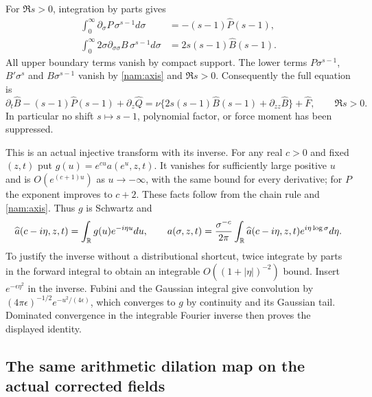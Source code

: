 For $\Re s>0$, integration by parts gives
\begin{align*}
 \int_0^\infty\partial_\sigma P\,\sigma^{s-1}d\sigma
    &=-(s-1)\widehat P(s-1),\\
 \int_0^\infty 2\sigma\partial_{\sigma\sigma}B\,
                       \sigma^{s-1}d\sigma
    &=2s(s-1)\widehat B(s-1).
\end{align*}
All upper boundary terms vanish by compact support. The lower terms
$P\sigma^{s-1}$, $B'\sigma^s$ and $B\sigma^{s-1}$ vanish by
\eqref{nam:axis} and $\Re s>0$. Consequently the full equation is
\begin{equation}
 \partial_t\widehat B-(s-1)\widehat P(s-1)+\partial_z\widehat Q
 =\nu\{2s(s-1)\widehat B(s-1)+\partial_{zz}\widehat B\}
       +\widehat F,\qquad\Re s>0.
 \label{nam:mellin}
\end{equation}
In particular no shift $s\mapsto s-1$, polynomial factor, or force
moment has been suppressed.

This is an actual injective transform with its inverse. For any real
$c>0$ and fixed $(z,t)$ put $g(u)=e^{cu}a(e^u,z,t)$.
It vanishes for sufficiently large positive $u$ and is
$O(e^{(c+1)u})$ as $u\to-\infty$, with the same bound for every
derivative; for $P$ the exponent improves to $c+2$.
These facts follow from the chain rule and \eqref{nam:axis}.
Thus $g$ is Schwartz and
\[
 \widehat a(c-i\eta,z,t)=\int_\mathbb R g(u)e^{-i\eta u}du,
 \qquad
 a(\sigma,z,t)=\frac{\sigma^{-c}}{2\pi}\int_\mathbb R
          \widehat a(c-i\eta,z,t)e^{i\eta\log\sigma}d\eta.
\]
To justify the inverse without a distributional shortcut, twice
integrate by parts in the forward integral to obtain an integrable
$O((1+|\eta|)^{-2})$ bound. Insert $e^{-\epsilon\eta^2}$ in the
inverse. Fubini and the Gaussian integral give convolution by
$(4\pi\epsilon)^{-1/2}e^{-u^2/(4\epsilon)}$, which converges to
$g$ by continuity and its Gaussian tail. Dominated convergence in
the integrable Fourier inverse then proves the displayed identity.

\subsection{The same arithmetic dilation map on the actual corrected fields}

